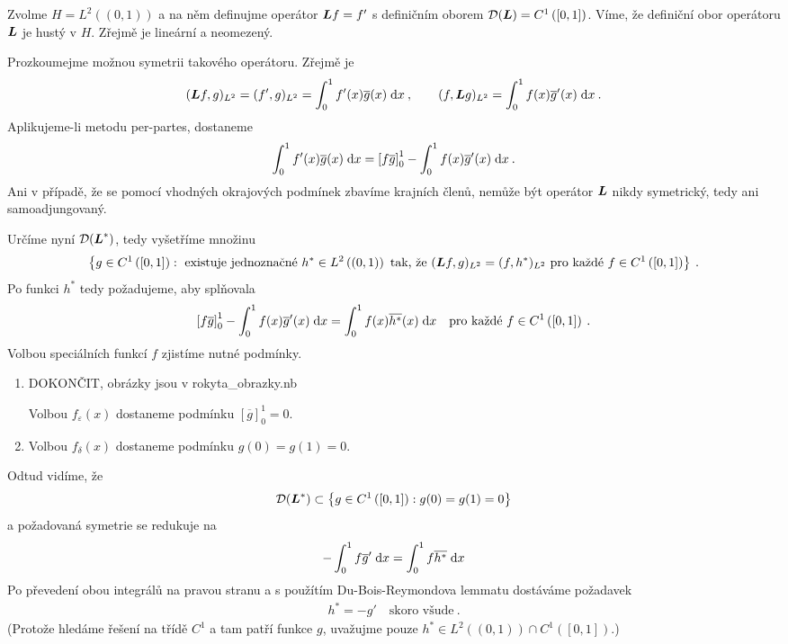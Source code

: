 \begin{example}
Zvolme $H = L^2 \left( (0,1) \right)$ a na něm definujme operátor $\boldsymbol{L} f = f'$ s definičním oborem $\mathcal{D}(\boldsymbol{L}) = C^1 \left( [0,1] \right)$. Víme, že definiční obor operátoru $\boldsymbol{L}$ je hustý v $H$.  Zřejmě je lineární a neomezený.

Prozkoumejme možnou symetrii takového operátoru. Zřejmě je \begin{align*}
    (\boldsymbol{L} f,g)_{L^2} =(f',g)_{L^2} = \int_0^1 f'(x) \overline{g}(x) \;\mathrm{d}x \:, \qquad (f,\boldsymbol{L} g)_{L^2} = \int_0^1 f(x) \overline{g}'(x) \;\mathrm{d}x \:. 
\end{align*}
Aplikujeme-li metodu per-partes, dostaneme \begin{align*}
    \int_0^1 f'(x) \overline{g}(x) \;\mathrm{d}x = \left[ f \overline {g} \right]_0^1 - \int_0^1 f(x) \overline{g}'(x) \;\mathrm{d}x \:.
\end{align*}
Ani v případě, že se pomocí vhodných okrajových podmínek zbavíme krajních členů, nemůže být operátor $\boldsymbol{L}$ nikdy symetrický, tedy ani samoadjungovaný.

Určíme nyní $\mathcal{D}(\boldsymbol{L}^*)$, tedy vyšetříme množinu \begin{align*}
    \left \lbrace g \in C^1 \left( [0,1 ]\right) : \text{ existuje jednoznačné } h^* \in L^2\left( (0,1)\right) \text{ tak, že } (\boldsymbol{L} f,g)_{L^2}=(f, h^*)_{L^2} \text{ pro každé } f \in C^1 \left( [0,1 ]\right)  \right \rbrace \:.
\end{align*}
Po funkci $h^*$ tedy požadujeme, aby splňovala \begin{align*}
    \left[ f \overline {g} \right]_0^1 - \int_0^1 f(x) \overline{g}'(x) \;\mathrm{d}x = \int_0^1 f(x) \overline{h^*}(x) \;\mathrm{d}x \quad \text{pro každé } f \in C^1\left( [0,1 ]\right) \:.
\end{align*}
Volbou speciálních funkcí $f$ zjistíme nutné podmínky. \begin{enumerate}
    \item DOKONČIT, obrázky jsou v \textrm{rokyta\_obrazky.nb}
    
    Volbou $f_\varepsilon(x)$ dostaneme podmínku $[\overline{g}]_0^1=0$.
    \item Volbou $f_\delta(x)$ dostaneme podmínku $g(0)=g(1)=0$.
\end{enumerate}
Odtud vidíme, že \begin{align*}
    \mathcal{D}(\boldsymbol{L}^*) \subset \left \lbrace g \in C^1 \left( [0,1 ]\right) : g(0)=g(1)=0 \right \rbrace
\end{align*}
a požadovaná symetrie se redukuje na \begin{align*}
     -\int_0^1 f \overline{g}' \;\mathrm{d}x = \int_0^1 f \overline{h^*} \;\mathrm{d}x 
\end{align*}
Po převedení obou integrálů na pravou stranu a s použítím Du-Bois-Reymondova lemmatu dostáváme požadavek \begin{align*}
    h^* = -g' \quad \text{skoro všude} \:.
\end{align*}
(Protože hledáme řešení na třídě $C^1$ a tam patří funkce $g$, uvažujme pouze $h^* \in L^2\left( (0,1)\right) \cap C^1 \left(  [0,1] \right)$.)


\end{example}
